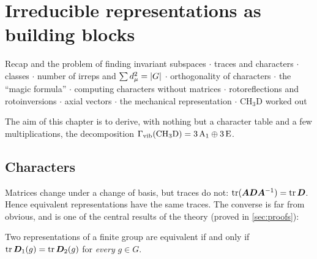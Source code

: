 \chapter{Irreducible representations as building blocks}\label{ch:building}

\begin{watch}{}
Recap and the problem of finding invariant subspaces  $\cdot$
traces and characters  $\cdot$
classes  $\cdot$
number of irreps and $\sum d_\mu^2=\lvert G\rvert$  $\cdot$
orthogonality of characters  $\cdot$
the ``magic formula''  $\cdot$
computing characters without matrices  $\cdot$
rotoreflections and rotoinversions  $\cdot$
axial vectors  $\cdot$
the mechanical representation  $\cdot$
$\mathrm{CH_3D}$ worked out 
\end{watch}

The aim of this chapter is to derive, with nothing but a character table and a few
multiplications, the decomposition $\Gamma_{\mathrm{vib}}(\mathrm{CH_3D})=3\,\mathrm{A}_1\oplus3\,\mathrm{E}$.

\section{Characters}

Matrices change under a change of basis, but traces do not:
$\operatorname{tr}(\bm{A}\bm{D}\bm{A}^{-1})=\operatorname{tr}\bm{D}$. Hence equivalent representations have
the same traces. The converse is far from obvious, and is one of the central
results of the theory (proved in \cref{sec:proofs}):

\begin{theorem}\label{thm:charequiv}
Two representations of a finite group are equivalent if and only if
$\operatorname{tr}\bm{D}_1(g)=\operatorname{tr}\bm{D}_2(g)$ for \emph{every} $g\in G$.
\end{theorem}

